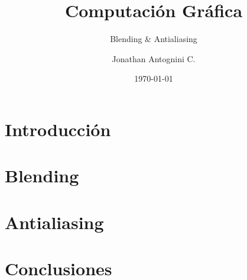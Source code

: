 \documentclass{beamer}
\title{Computación Gráfica}
\subtitle{Blending \& Antialiasing}
\author{Jonathan Antognini C.
}
\institute[]{Universidad Técnica Federico Santa María}
\date{\today}
\begin{document}
    \frame{\titlepage}
    \frame{\tableofcontents}
	\newpage
	\section{Introducción}
		
	
	\newpage
	\section{Blending}
		

	\newpage
	\section{Antialiasing}
		
	
	\newpage
	\section{Conclusiones}
		

	\newpage
		
\end{document}

